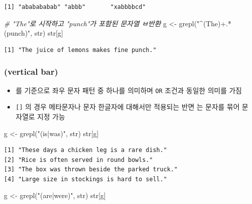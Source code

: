 \documentclass[
  11pt,
]{krantz}
\newenvironment{Shaded}{\begin{snugshade}}{\end{snugshade}}
\newcommand{\CommentTok}[1]{\textcolor[rgb]{0.37,0.37,0.37}{\textit{#1}}}
\newcommand{\FunctionTok}[1]{\textcolor[rgb]{0,0,0}{#1}}
\newcommand{\NormalTok}[1]{#1}
\newcommand{\OtherTok}[1]{\textcolor[rgb]{0.37,0.37,0.37}{#1}}
\newcommand{\StringTok}[1]{\textcolor[rgb]{0.5,0.5,0.5}{#1}}
\providecommand{\tightlist}{%
  \setlength{\itemsep}{0pt}\setlength{\parskip}{0pt}}
\begin{document}
\begin{verbatim}
[1] "ababababab" "abbb"       "xabbbbcd"  
\end{verbatim}

\begin{Shaded}
\begin{Highlighting}[]
\CommentTok{\# "The"로 시작하고  "punch"가 포함된 문자열 ㅂ반환}
\NormalTok{g }\OtherTok{\textless{}{-}} \FunctionTok{grepl}\NormalTok{(}\StringTok{"\^{}(The)+.*(punch)"}\NormalTok{, str)}
\NormalTok{str[g]}
\end{Highlighting}
\end{Shaded}

\begin{verbatim}
[1] "The juice of lemons makes fine punch."
\end{verbatim}

\normalsize

\hypertarget{vertical-bar}{%
\subsubsection*{\texorpdfstring{\textbf{\texttt{\textbar{}} (vertical bar)}}{\textbar{} (vertical bar)}}\label{vertical-bar}}


\begin{itemize}
\tightlist
\item
  \texttt{\textbar{}}를 기준으로 좌우 문자 패턴 중 하나를 의미하며 \texttt{OR} 조건과 동일한 의미를 가짐
\item
  \texttt{{[}{]}} 의 경우 메타문자나 문자 한글자에 대해서만 적용되는 반면 \texttt{\textbar{}}는 문자를 묶어 문자열로 지정 가능
\end{itemize}

\footnotesize

\begin{Shaded}
\begin{Highlighting}[]
\NormalTok{g }\OtherTok{\textless{}{-}} \FunctionTok{grepl}\NormalTok{(}\StringTok{"(is|was)"}\NormalTok{, str)}
\NormalTok{str[g]}
\end{Highlighting}
\end{Shaded}

\begin{verbatim}
[1] "These days a chicken leg is a rare dish."   
[2] "Rice is often served in round bowls."       
[3] "The box was thrown beside the parked truck."
[4] "Large size in stockings is hard to sell."   
\end{verbatim}

\begin{Shaded}
\begin{Highlighting}[]
\NormalTok{g }\OtherTok{\textless{}{-}} \FunctionTok{grepl}\NormalTok{(}\StringTok{"(are|were)"}\NormalTok{, str)}
\NormalTok{str[g]}
\end{Highlighting}
\end{Shaded}
\end{document}
